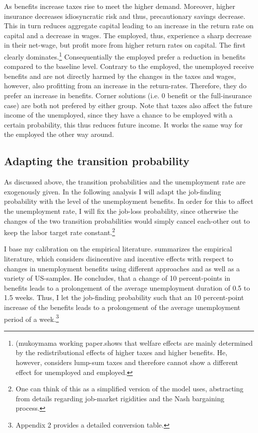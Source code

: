 \documentclass[a4paper,12pt]{article}
\begin{document}
As benefits increase taxes rise to meet the higher demand. Moreover, higher insurance decreases idiosyncratic risk and thus, precautionary savings decrease. This in turn reduces aggregate capital leading to an increase in the return rate on capital and a decrease in wages. 
The employed, thus, experience a sharp decrease in their net-wage, but profit more from higher return rates on capital. The first clearly dominates.\footnote{ (mukoymama working paper.shows that welfare effects are mainly determined by the redistributional effects of higher taxes and higher benefits. He, however, considers lump-sum taxes and therefore cannot show a different effect for unemployed and employed.} Consequentially the employed prefer a reduction in benefits compared to the baseline level. 
Contrary to the employed, the unemployed receive benefits and are not directly harmed by the changes in the taxes and wages, however, also profitting from an increase in the return-rates. 
Therefore, they do prefer an increase in benefits. 
Corner solutions (i.e. 0 benefit or the full-insurance case) are both not prefered by either group. Note that taxes also affect the future income of the unemployed, since they have a chance to be employed with a certain probability, this thus reduces future income. It works the same way for the employed the other way around. 





\subsection{Adapting the transition probability}

As discussed above, the transition probabilities and the unemployment rate are exogenously given. In the following analysis I will adapt the job-finding probability with the level of the unemployment benefits. In order for this to affect the unemployment rate, I will fix the job-loss probability, since otherwise the changes of the two transition probabilities would simply cancel each-other out to keep the labor target rate constant.\footnote{One can think of this as a simplified version of the model \cite{mukoyama} uses, abstracting from details regarding job-market rigidities and the Nash bargaining process.} 

I base my calibration on the empirical literature. \citep{decker} summarizes the empirical literature, which considers disincentive and incentive effects with respect to changes in unemployment benefits using different approaches and as well as a variety of US-samples. He concludes, that a change of 10 percent-points in benefits leads to a prolongement of the average unemployment duration of 0.5 to 1.5 weeks. 
Thus, I let the job-finding probability such that an 10 percent-point increase of the benefits leads to a prolongement of the average unemployment period of a week.\footnote{Appendix 2 provides a detailed conversion table.}
\end{document}
